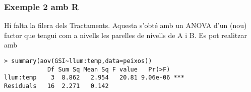 \documentclass[12pt,t]{beamer}
\theoremstyle{plain}
\theoremstyle{definition}
\begin{document}
\begin{frame}[fragile]
\frametitle{Exemple 2 amb R}

Hi falta la filera dels Tractaments. Aquesta s'obté amb un ANOVA d'un (nou) factor que tengui com a  nivells les parelles de nivells de A i B. Es pot realitzar amb
{\small \begin{verbatim}
> summary(aov(GSI~llum:temp,data=peixos))
            Df Sum Sq Mean Sq F value   Pr(>F)    
llum:temp    3  8.862   2.954   20.81 9.06e-06 ***
Residuals   16  2.271   0.142                     
\end{verbatim}
}


\end{frame}

%
%
%
%
%
%
%
%
%
\end{document}
